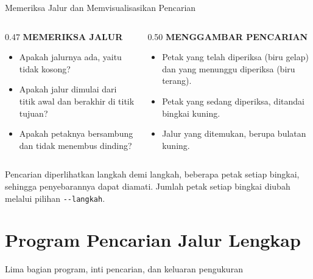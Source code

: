 \documentclass[aspectratio=169,10pt]{beamer}
\begin{document}
\begin{frame}{Memeriksa Jalur dan Memvisualisasikan Pencarian}
\begin{columns}[T,onlytextwidth]
  \begin{column}{0.47\textwidth}
    {\fontsize{7}{8.5}\selectfont\bfseries\color{ubAccent}MEMERIKSA JALUR}\par
    \vspace{0.04cm}
    \begin{itemize}
      \item Apakah jalurnya ada, yaitu tidak kosong?
      \item Apakah jalur dimulai dari titik awal dan berakhir di titik tujuan?
      \item Apakah petaknya bersambung dan tidak menembus dinding?
    \end{itemize}
  \end{column}
  \begin{column}{0.50\textwidth}
    {\fontsize{7}{8.5}\selectfont\bfseries\color{ubAccent}MENGGAMBAR PENCARIAN}\par
    \vspace{0.04cm}
    \begin{itemize}
      \item Petak yang telah diperiksa (biru gelap) dan yang menunggu
            diperiksa (biru terang).
      \item Petak yang sedang diperiksa, ditandai bingkai kuning.
      \item Jalur yang ditemukan, berupa bulatan kuning.
    \end{itemize}
  \end{column}
\end{columns}
\vspace{0.14cm}
\begin{kotak}
Pencarian diperlihatkan langkah demi langkah, beberapa petak setiap bingkai,
sehingga penyebarannya dapat diamati. Jumlah petak setiap bingkai diubah
melalui pilihan \texttt{-{}-langkah}.
\end{kotak}
\end{frame}

\section{Program Pencarian Jalur Lengkap}
  {Lima bagian program, inti pencarian, dan keluaran pengukuran}
\end{document}
